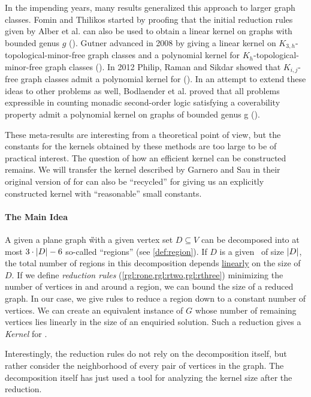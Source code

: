 In the impending years, many results generalized this approach to larger graph classes. Fomin and Thilikos started by proofing that the initial reduction rules given by Alber et al. \cite{Alber2004} can also be used to obtain a linear kernel on graphs with bounded genus $g$ (\cite{Fomin2004}).
Gutner advanced in 2008 by giving a linear kernel on $K_{3,h}$-topological-minor-free graph classes and a polynomial kernel for $K_h$-topological-minor-free graph classes (\cite{Gutner2009}). 
In 2012 Philip, Raman and Sikdar showed that $K_{i,j}$-free graph classes admit a polynomial kernel for \dom (\cite{Philip2012}). 
In an attempt to extend these ideas to other problems as well, Bodlaender et al. proved that all problems expressible in counting monadic second-order logic satisfying a coverability property admit a polynomial kernel on graphs of bounded genus g (\cite{Bodlaender2016}).

These meta-results are interesting from a theoretical point of view, but the constants for the kernels obtained by these methods are too large to be of practical interest. The question of how an efficient kernel can be constructed remains. We will transfer the kernel described by Garnero and Sau in their original version of \cite[Revision 2014]{Garnero2018} for \ptdom can also be ``recycled'' for \psdom giving us an explicitly constructed kernel with ``reasonable'' small constants.

 \paragraph{The Main Idea} A given a plane graph \G with a given vertex set $D \subseteq V$ can be decomposed into at most $3 \cdot \abs{D} -6$ so-called ``regions'' (see \cref{def:region}). If $D$ is a given \sdom~of size $\abs{D}$, the total number of regions in this decomposition depends \underline{linearly} on the size of $D$. If we define \textit{reduction rules} (\cref{rgl:rone,rgl:rtwo,rgl:rthree})  minimizing the number of vertices in and around a region, we can bound the size of a reduced graph. In our case, we give rules to reduce a region down to a constant number of vertices. We can create an equivalent instance of $G$ whose number of remaining vertices lies linearly in the size of an enquiried solution. Such a reduction gives a \textit{Kernel} for \psdom.


Interestingly, the reduction rules do not rely on the decomposition itself, but rather consider the neighborhood of every pair of vertices in the graph. The decomposition itself has just used a tool for analyzing the kernel size after the reduction.

